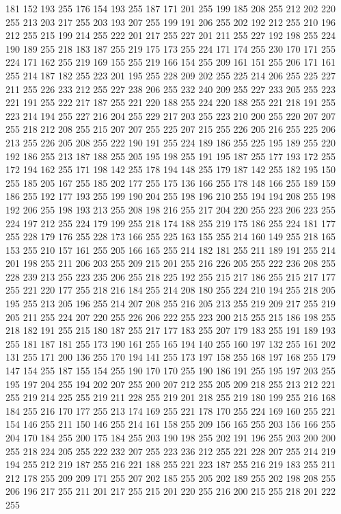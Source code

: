 181 152 193 255 176 154 193 255 187 171 201 255 199 185 208 255 212 202 220 255 213 203 217 255 203 193 207 255 199 191 206 255 202 192 212 255 210 196 212 255 215 199 214 255 222 201 217 255 227 201 211 255 227 192 198 255 224 190 189 255 218 183 187 255
219 175 173 255 224 171 174 255 230 170 171 255 224 171 162 255 219 169 155 255 219 166 154 255 209 161 151 255 206 171 161 255 214 187 182 255 223 201 195 255 228 209 202 255 225 214 206 255 225 227 211 255 226 233 212 255 227 238 206 255 232 240 209 255
227 233 205 255 223 221 191 255 222 217 187 255 221 220 188 255 224 220 188 255 221 218 191 255 223 214 194 255 227 216 204 255 229 217 203 255 223 210 200 255 220 207 207 255 218 212 208 255 215 207 207 255 225 207 215 255 226 205 216 255 225 206 213 255
226 205 208 255 222 190 191 255 224 189 186 255 225 195 189 255 220 192 186 255 213 187 188 255 205 195 198 255 191 195 187 255 177 193 172 255 172 194 162 255 171 198 142 255 178 194 148 255 179 187 142 255 182 195 150 255 185 205 167 255 185 202 177 255
175 136 166 255 178 148 166 255 189 159 186 255 192 177 193 255 199 190 204 255 198 196 210 255 194 194 208 255 198 192 206 255 198 193 213 255 208 198 216 255 217 204 220 255 223 206 223 255 224 197 212 255 224 179 199 255 218 174 188 255 219 175 186 255
224 181 177 255 228 179 176 255 228 173 166 255 225 163 155 255 214 160 149 255 218 165 153 255 210 157 161 255 205 166 165 255 214 182 181 255 211 189 191 255 214 201 198 255 211 206 203 255 209 215 201 255 216 226 205 255 222 236 208 255 228 239 213 255
223 235 206 255 218 225 192 255 215 217 186 255 215 217 177 255 221 220 177 255 218 216 184 255 214 208 180 255 224 210 194 255 218 205 195 255 213 205 196 255 214 207 208 255 216 205 213 255 219 209 217 255 219 205 211 255 224 207 220 255 226 206 222 255
223 200 215 255 215 186 198 255 218 182 191 255 215 180 187 255 217 177 183 255 207 179 183 255 191 189 193 255 181 187 181 255 173 190 161 255 165 194 140 255 160 197 132 255 161 202 131 255 171 200 136 255 170 194 141 255 173 197 158 255 168 197 168 255
179 147 154 255 187 155 154 255 190 170 170 255 190 186 191 255 195 197 203 255 195 197 204 255 194 202 207 255 200 207 212 255 205 209 218 255 213 212 221 255 219 214 225 255 219 211 228 255 219 201 218 255 219 180 199 255 216 168 184 255 216 170 177 255
213 174 169 255 221 178 170 255 224 169 160 255 221 154 146 255 211 150 146 255 214 161 158 255 209 156 165 255 203 156 166 255 204 170 184 255 200 175 184 255 203 190 198 255 202 191 196 255 203 200 200 255 218 224 205 255 222 232 207 255 223 236 212 255
221 228 207 255 214 219 194 255 212 219 187 255 216 221 188 255 221 223 187 255 216 219 183 255 211 212 178 255 209 209 171 255 207 202 185 255 205 202 189 255 202 198 208 255 206 196 217 255 211 201 217 255 215 201 220 255 216 200 215 255 218 201 222 255
